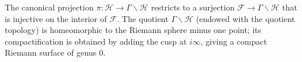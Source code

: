 The canonical projection $\pi: \mathcal{H} \to \Gamma \backslash \mathcal{H}$ restricts to a surjection $\mathcal{F} \to \Gamma \backslash \mathcal{H}$ that is injective on the interior of $\mathcal{F}$. The quotient $\Gamma \backslash \mathcal{H}$ (endowed with the quotient topology) is homeomorphic to the Riemann sphere minus one point; its compactification is obtained by adding the cusp at $i\infty$, giving a compact Riemann surface of genus 0.
